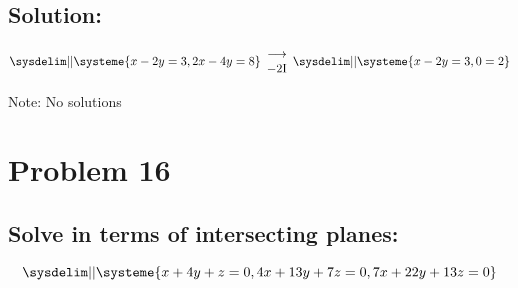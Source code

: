 \documentclass{article}
\begin{document}
\subsection*{Solution:}
\begin{equation}
    \sysdelim||\systeme{
        x - 2y = 3,
        2x - 4y = 8
    }
    \begin{array}{rr}
        \longrightarrow
        \\
        -2$I$
    \end{array}
    \sysdelim||\systeme{
        x - 2y = 3,
        0 = 2
    }
\end{equation}
\begin{center}Note: No solutions\end{center}
\begin{center}
\end{center}

\noindent\makebox[\linewidth]{\rule{16cm}{0.4pt}}
\section*{Problem 16}
\subsection*{Solve in terms of intersecting planes: }
$$
\sysdelim||\systeme{
    x + 4y + z = 0,
    4x + 13y + 7z = 0,
    7x + 22y + 13z = 0
}
$$
\end{document}
